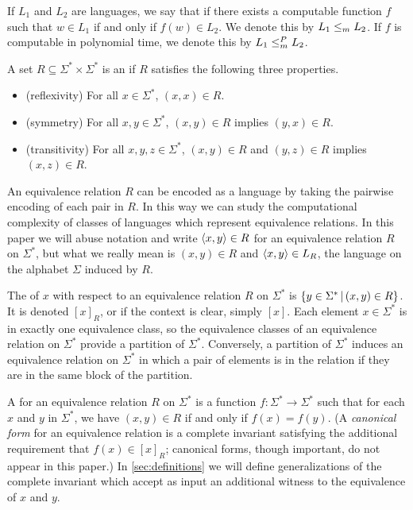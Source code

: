 If $L_1$ and $L_2$ are languages, we say that  if there exists a computable function $f$ such that $w \in L_1$ if and only if $f(w) \in L_2$.
We denote this by $L_1 \leq_m L_2$.
If $f$ is computable in polynomial time, we denote this by $L_1 \leq^{P}_{m} L_2$.

A set $R \subseteq \Sigma^* \times \Sigma^*$ is an  if $R$ satisfies the following three properties.
\begin{itemize}
\item (reflexivity) For all $x \in \Sigma^*$, $(x,x)\in R$.
\item (symmetry) For all $x,y\in \Sigma^*$, $(x,y)\in R$ implies $(y,x)\in R$.
\item (transitivity) For all $x,y,z\in \Sigma^*$, $(x,y)\in R$ and $(y,z)\in R$ implies $(x,z)\in R$.
\end{itemize}
An equivalence relation $R$ can be encoded as a language by taking the pairwise encoding of each pair in $R$.
In this way we can study the computational complexity of classes of languages which represent equivalence relations.
In this paper we will abuse notation and write $\left\langle x,y\right\rangle\in R$ for an equivalence relation $R$ on $\Sigma^*$, but what we really mean is $(x,y)\in R$ and $\left\langle x,y\right\rangle\in L_R$, the language on the alphabet $\Sigma$ induced by $R$.

The  of $x$ with respect to an equivalence relation $R$ on $\Sigma^*$ is $\left\{ y\in \Sigma^* \,\middle|\, (x,y)\in R \right\}$.
It is denoted $[x]_R$, or if the context is clear, simply $[x]$.
Each element $x\in \Sigma^*$ is in exactly one equivalence class, so the equivalence classes of an equivalence relation on $\Sigma^*$ provide a partition of $\Sigma^*$.
Conversely, a partition of $\Sigma^*$ induces an equivalence relation on $\Sigma^*$ in which a pair of elements is in the relation if they are in the same block of the partition.

A  for an equivalence relation $R$ on $\Sigma^*$ is a function $f\colon \Sigma^* \to \Sigma^*$ such that for each $x$ and $y$ in $\Sigma^*$, we have $(x, y) \in R$ if and only if $f(x) = f(y)$.
(A \emph{canonical form} for an equivalence relation is a complete invariant satisfying the additional requirement that $f(x) \in [x]_R$; canonical forms, though important, do not appear in this paper.)
In \autoref{sec:definitions} we will define generalizations of the complete invariant which accept as input an additional witness to the equivalence of $x$ and $y$.

